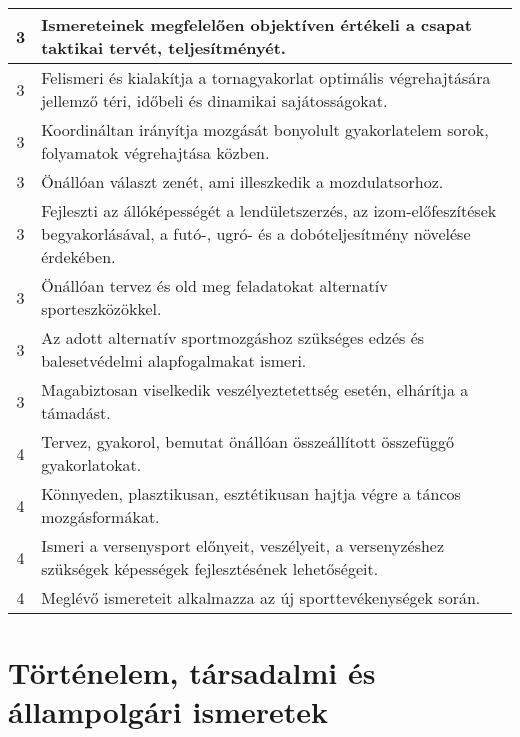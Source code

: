 \begin{longtable}{c | p{} }
                                
                                          3 &  Ismereteinek megfelelően objektíven értékeli a csapat taktikai tervét, teljesítményét. \\ \hline
                                          3 &  Felismeri és kialakítja a tornagyakorlat optimális végrehajtására jellemző téri, időbeli és dinamikai sajátosságokat. \\ \hline
                                          3 &  Koordináltan irányítja mozgását bonyolult gyakorlatelem sorok, folyamatok végrehajtása közben. \\ \hline
                                          3 &  Önállóan választ zenét, ami illeszkedik a mozdulatsorhoz. \\ \hline
                                          3 &  Fejleszti az állóképességét a lendületszerzés, az izom-előfeszítések begyakorlásával, a futó-, ugró- és a dobóteljesítmény növelése érdekében. \\ \hline
                                          3 &  Önállóan tervez  és old meg feladatokat alternatív sporteszközökkel. \\ \hline
                                          3 &  Az adott alternatív sportmozgáshoz szükséges edzés és balesetvédelmi alapfogalmakat ismeri. \\ \hline
                                          3 &  Magabiztosan viselkedik veszélyeztetettség esetén, elhárítja a támadást. \\ \hline
                                      
                                
                                          4 &  Tervez, gyakorol, bemutat önállóan összeállított összefüggő gyakorlatokat. \\ \hline
                                          4 &  Könnyeden, plasztikusan, esztétikusan hajtja végre a táncos mozgásformákat. \\ \hline
                                          4 &  Ismeri a versenysport előnyeit, veszélyeit, a versenyzéshez szükségek képességek fejlesztésének lehetőségeit. \\ \hline
                                          4 &  Meglévő ismereteit alkalmazza az új sporttevékenységek során. \\ \hline
                                      
                        \end{longtable}
            \clearpage

        \section{Történelem, társadalmi és állampolgári ismeretek}

